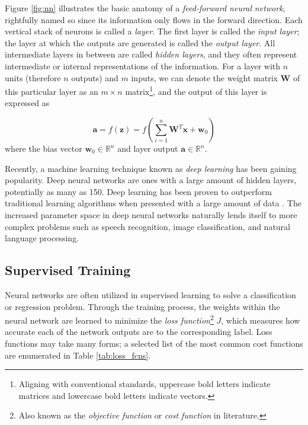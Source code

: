 Figure \ref{fig:nn} illustrates the basic anatomy of a \emph{feed-forward neural network}, rightfully named so since its information only flows in the forward direction. Each vertical stack of neurons is called a \emph{layer}. The first layer is called the \emph{input layer}; the layer at which the outputs are generated is called the \emph{output layer}. All intermediate layers in between are called \emph{hidden layers}, and they often represent intermediate or internal representations of the information. For a layer with $n$ units (therefore $n$ outputs) and $m$ inputs, we can denote the weight matrix $\mathbf{W}$ of this particular layer as an $m\times n$ matrix\footnote{Aligning with conventional standards, uppercase bold letters indicate matrices and lowercase bold letters indicate vectors.}, and the output of this layer is expressed as

\begin{equation}
    \label{eqn:layer}
    \mathbf{a} = f(\mathbf{z}) = f\left( \sum_{i=1}^n \mathbf{W}^T\mathbf{x} + \mathbf{w}_0\right) 
\end{equation}
where the bias vector $\mathbf{w}_0 \in \mathbb{R}^n$ and layer output $\mathbf{a} \in \mathbb{R}^n$. 

Recently, a machine learning technique known as \emph{deep learning} has been gaining popularity. Deep neural networks are ones with a large amount of hidden layers, potentially as many as 150. Deep learning has been proven to outperform traditional learning algorithms when presented with a large amount of data \cite{andrew_ng}. The increased parameter space in deep neural networks naturally lends itself to more complex problems such as speech recognition, image classification, and natural language processing. 


\subsection{Supervised Training} \label{ch:ml:nn:train}

Neural networks are often utilized in supervised learning to solve a classification or regression problem. Through the training process, the weights within the neural network are learned to minimize the \emph{loss function}\footnote{Also known as the \emph{objective function} or \emph{cost function} in literature.} $J$, which measures how accurate each of the network outputs are to the corresponding label. Loss functions may take many forms; a selected list of the most common cost functions are enumerated in Table \ref{tab:loss_fcns}. 

